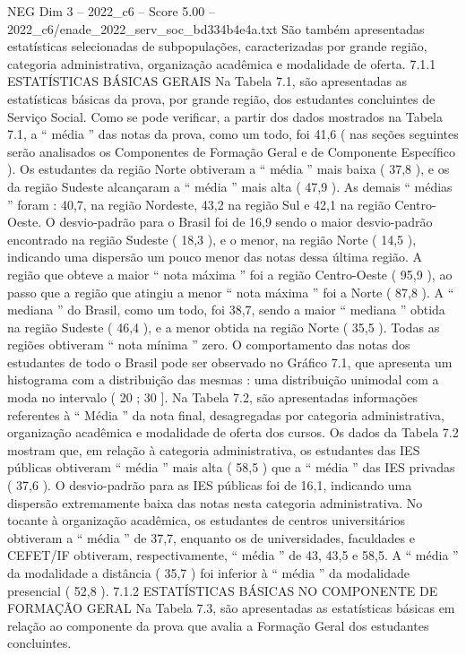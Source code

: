 \begin{textsample}{NEG Dim 3 – 2022\_c6 – Score 5.00 – 2022\_c6/enade\_2022\_serv\_soc\_bd334b4e4a.txt}
São também apresentadas estatísticas selecionadas de subpopulações, caracterizadas por grande região, categoria administrativa, organização acadêmica e modalidade de oferta. 7.1.1 ESTATÍSTICAS BÁSICAS GERAIS Na Tabela 7.1, são apresentadas as estatísticas básicas da prova, por grande região, dos estudantes concluintes de Serviço Social.
Como se pode verificar, a partir dos dados mostrados na Tabela 7.1, a “ média ” das notas da prova, como um todo, foi 41,6 ( nas seções seguintes serão analisados os Componentes de Formação Geral e de Componente Específico ).
Os estudantes da região Norte obtiveram a “ média ” mais baixa ( 37,8 ), e os da região Sudeste alcançaram a “ média ” mais alta ( 47,9 ).
As demais “ médias ” foram : 40,7, na região Nordeste, 43,2 na região Sul e 42,1 na região Centro-Oeste.
O desvio-padrão para o Brasil foi de 16,9 sendo o maior desvio-padrão encontrado na região Sudeste ( 18,3 ), e o menor, na região Norte ( 14,5 ), indicando uma dispersão um pouco menor das notas dessa última região.
A região que obteve a maior “ nota máxima ” foi a região Centro-Oeste ( 95,9 ), ao passo que a região que atingiu a menor “ nota máxima ” foi a Norte ( 87,8 ).
A “ mediana ” do Brasil, como um todo, foi 38,7, sendo a maior “ mediana ” obtida na região Sudeste ( 46,4 ), e a menor obtida na região Norte ( 35,5 ).
Todas as regiões obtiveram “ nota mínima ” zero.
O comportamento das notas dos estudantes de todo o Brasil pode ser observado no Gráfico 7.1, que apresenta um histograma com a distribuição das mesmas : uma distribuição unimodal com a moda no intervalo ( 20 ; 30 ].
Na Tabela 7.2, são apresentadas informações referentes à “ Média ” da nota final, desagregadas por categoria administrativa, organização acadêmica e modalidade de oferta dos cursos.
Os dados da Tabela 7.2 mostram que, em relação à categoria administrativa, os estudantes das IES públicas obtiveram “ média ” mais alta ( 58,5 ) que a “ média ” das IES privadas ( 37,6 ).
O desvio-padrão para as IES públicas foi de 16,1, indicando uma dispersão extremamente baixa das notas nesta categoria administrativa.
No tocante à organização acadêmica, os estudantes de centros universitários obtiveram a “ média ” de 37,7, enquanto os de universidades, faculdades e CEFET/IF obtiveram, respectivamente, “ média ” de 43, 43,5 e 58,5.
A “ média ” da modalidade a distância ( 35,7 ) foi inferior à “ média ” da modalidade presencial ( 52,8 ). 7.1.2 ESTATÍSTICAS BÁSICAS NO COMPONENTE DE FORMAÇÃO GERAL Na Tabela 7.3, são apresentadas as estatísticas básicas em relação ao componente da prova que avalia a Formação Geral dos estudantes concluintes.

\end{textsample}
